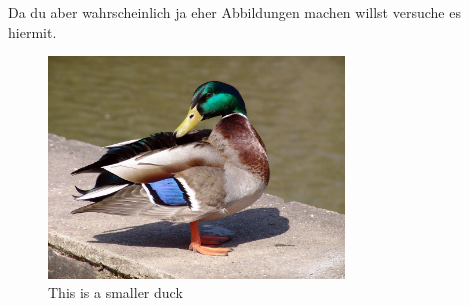 Da du aber wahrscheinlich ja eher Abbildungen machen willst versuche es hiermit.

\begin{figure}[h]
	\centering
	\includegraphics[width=0.7\textwidth]{images/duck.jpg}
	\caption{This is a smaller duck}
	\label{fig:duck}
\end{figure}